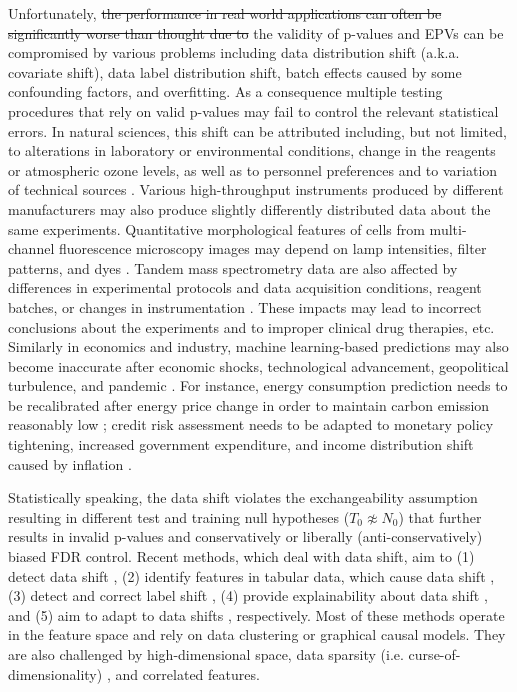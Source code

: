 \documentclass{article}
\newcommand{\correction}[2]{{\color{red}\sout{#1}}{\color{red}#2}}
\newcommand{\edit}[1]{{\color{red}#1}}
\begin{document}
Unfortunately, \correction{the  performance in real world applications can often be significantly worse than thought due to }{the validity of p-values and EPVs can be compromised by various problems including  } data distribution shift (a.k.a. covariate shift), data label distribution shift, batch effects \cite{Candela2009DatasetShift} caused by some confounding factors, and overfitting. \edit{As a consequence multiple testing procedures that rely on valid p-values may fail to control the relevant statistical errors.} In natural sciences, this shift can be attributed including, but not limited, to alterations in laboratory or environmental conditions, change in the reagents or atmospheric ozone levels, as well as to personnel preferences and to variation of technical sources \cite{leek2010tackling}. Various high-throughput instruments produced by different manufacturers may also produce slightly differently distributed data about the same experiments. Quantitative morphological features of cells from multi-channel fluorescence microscopy images may depend on lamp intensities, filter patterns, and dyes \cite{bray2016cell}. Tandem mass spectrometry data are also affected by differences in experimental protocols and data acquisition conditions, reagent batches, or changes in instrumentation \cite{phua2022perspectives, vcuklina2021diagnostics}. These impacts may lead to incorrect conclusions about the experiments and to improper clinical drug therapies, etc. Similarly in economics and industry, machine learning-based predictions may also become inaccurate after economic shocks, technological advancement, geopolitical turbulence, and pandemic \cite{ramey2016macroeconomic}. For instance, energy consumption prediction needs to be recalibrated after energy price change in order to maintain carbon emission reasonably low \cite{clement2023coping}; credit risk assessment needs to be adapted to monetary policy tightening, increased government expenditure, and income distribution shift caused by inflation \cite{kritzman2012regime,guo2023predict, Zhang:EECS-2021-262}.


\edit{Statistically speaking, the data shift violates the exchangeability assumption resulting in different test and training null hypotheses ($T_0 \not\approx N_0$) that further results in invalid p-values and} conservatively or liberally (anti-conservatively) biased FDR control. 
Recent methods, which deal with data shift, aim to (1) detect data shift  \cite{ dasu2009change}, (2) identify features in tabular data, which cause data shift \cite{kulinski2020feature}, (3) detect and correct label shift \cite{lipton2018detecting}, (4) provide explainability about data shift \cite{budhathoki2021did,kulinski2023towards}, and (5) aim to adapt to data shifts \cite{sui2024unleashing, zhang2021adaptive, zhang2022memo}, respectively. Most of these methods operate in the feature space and rely on data clustering or graphical causal models. They are also challenged by high-dimensional space, data sparsity (i.e. curse-of-dimensionality) \cite{donoho2000high}, and correlated features. 
\end{document}
